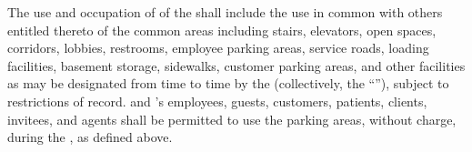 The use and occupation of \lessee of the \premises shall include the use in common with others entitled thereto of the common areas including stairs, elevators, open spaces, corridors, lobbies, restrooms, employee parking areas, service roads, loading facilities, basement storage, sidewalks, customer parking areas, and other facilities as may be designated from time to time by the \lessor (collectively, the ``''), subject to restrictions of record. \lessee and \lessee's employees, guests, customers, patients, clients, invitees, and agents shall be permitted to use the parking areas, without charge, during the \termOfLease, as defined above.
